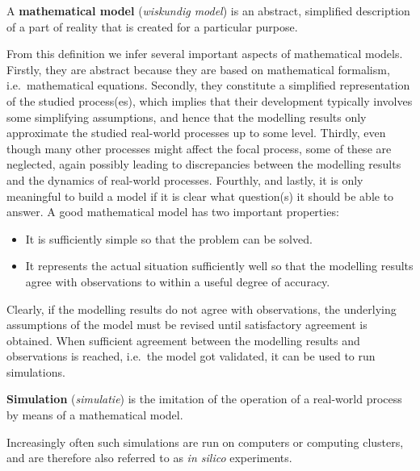 \begin{definition} 
A \textbf{mathematical model} (\textit{wiskundig model}) is an abstract, simplified description of a part of reality that is created for a particular purpose. 
\end{definition}

From this definition we infer several important aspects of mathematical models. Firstly, they are abstract because they are based on mathematical formalism, i.e.\ mathematical equations. Secondly, they constitute a simplified representation of the studied process(es), which implies that their development typically involves some simplifying assumptions, and hence that the modelling results only approximate the studied real-world processes up to some level. Thirdly, even though many other processes might affect the focal process, some of these are neglected, again possibly leading to discrepancies between the modelling results and the dynamics of real-world processes. Fourthly, and lastly, it is only meaningful to build a model if it is clear what question(s) it should be able to answer. A good mathematical model has two important properties:

\begin{itemize}
\item It is sufficiently simple so that the  problem can be solved.

\item It represents the actual situation sufficiently well so that the modelling results agree with observations to within a useful degree of accuracy. 
\end{itemize}

Clearly, if the modelling results do not agree with observations, the underlying assumptions of the model must be revised until satisfactory agreement is obtained. When sufficient agreement between the modelling results and observations is reached, i.e.\ the model got validated, it can be used to run simulations. 


\begin{definition} [Simulation]
\textbf{Simulation} (\textit{simulatie}) is the imitation of the operation of a real-world process by means of a mathematical model. 
\end{definition}

Increasingly often such simulations are run on computers or computing clusters, and are therefore also referred to as \textit{in silico} experiments. 

